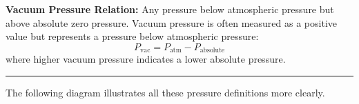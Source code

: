 \documentclass{article}
\begin{document}
\vspace{-2em}
\newpage\noindent
\textbf{Vacuum Pressure Relation:}  
Any pressure below atmospheric pressure but above absolute zero pressure. Vacuum pressure is often measured as a positive value but represents a pressure below atmospheric pressure:
\begin{equation}
	P_{\text{vac}} = P_{\text{atm}} - P_{\text{absolute}}
\end{equation}
where higher vacuum pressure indicates a lower absolute pressure.\\[-1em]
\vspace{0.7em}\hrule\vspace{0.7em}\noindent
The following diagram illustrates all these pressure definitions more clearly.\\\vspace{-1em}
\end{document}
